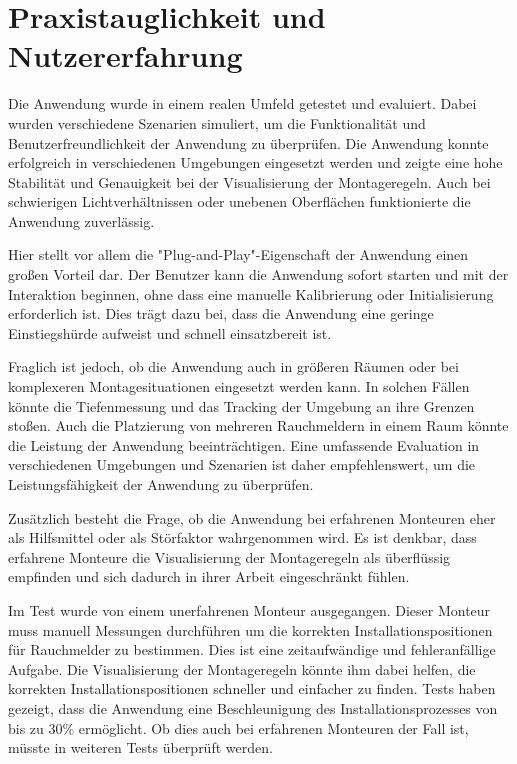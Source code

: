 \section{Praxistauglichkeit und Nutzererfahrung}

Die Anwendung wurde in einem realen Umfeld getestet und evaluiert. Dabei wurden verschiedene Szenarien simuliert, um die Funktionalität und Benutzerfreundlichkeit der Anwendung zu überprüfen. Die Anwendung konnte erfolgreich in verschiedenen Umgebungen eingesetzt werden und zeigte eine hohe Stabilität und Genauigkeit bei der Visualisierung der Montageregeln. Auch bei schwierigen Lichtverhältnissen oder unebenen Oberflächen funktionierte die Anwendung zuverlässig.

Hier stellt vor allem die "Plug-and-Play"-Eigenschaft der Anwendung einen großen Vorteil dar. Der Benutzer kann die Anwendung sofort starten und mit der Interaktion beginnen, ohne dass eine manuelle Kalibrierung oder Initialisierung erforderlich ist. Dies trägt dazu bei, dass die Anwendung eine geringe Einstiegshürde aufweist und schnell einsatzbereit ist.

Fraglich ist jedoch, ob die Anwendung auch in größeren Räumen oder bei komplexeren Montagesituationen  eingesetzt werden kann. In solchen Fällen könnte die Tiefenmessung und das Tracking der Umgebung an ihre Grenzen stoßen. Auch die Platzierung von mehreren Rauchmeldern in einem Raum könnte die Leistung der Anwendung beeinträchtigen. Eine umfassende Evaluation in verschiedenen Umgebungen und Szenarien ist daher empfehlenswert, um die Leistungsfähigkeit der Anwendung zu überprüfen.

Zusätzlich besteht die Frage, ob die Anwendung bei erfahrenen Monteuren eher als Hilfsmittel oder als Störfaktor wahrgenommen wird. Es ist denkbar, dass erfahrene Monteure die Visualisierung der Montageregeln als überflüssig empfinden und sich dadurch in ihrer Arbeit eingeschränkt fühlen. 

Im Test wurde von einem unerfahrenen Monteur ausgegangen. Dieser Monteur muss manuell Messungen durchführen um die korrekten Installationspositionen für Rauchmelder zu bestimmen. Dies ist eine zeitaufwändige und fehleranfällige Aufgabe. Die Visualisierung der Montageregeln könnte ihm dabei helfen, die korrekten Installationspositionen schneller und einfacher zu finden. Tests haben gezeigt, dass die Anwendung eine Beschleunigung des Installationsprozesses von bis zu 30\% ermöglicht. Ob dies auch bei erfahrenen Monteuren der Fall ist, müsste in weiteren Tests überprüft werden.

